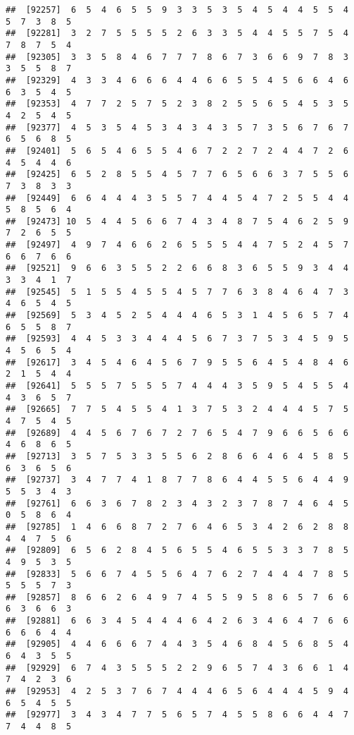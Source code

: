 \documentclass[
]{book}
\begin{document}
\begin{verbatim}
##  [92257]  6  5  4  6  5  5  9  3  3  5  3  5  4  5  4  4  5  5  4  5  7  3  8  5
##  [92281]  3  2  7  5  5  5  5  2  6  3  3  5  4  4  5  5  7  5  4  7  8  7  5  4
##  [92305]  3  3  5  8  4  6  7  7  7  8  6  7  3  6  6  9  7  8  3  3  5  5  8  7
##  [92329]  4  3  3  4  6  6  6  4  4  6  6  5  5  4  5  6  6  4  6  6  3  5  4  5
##  [92353]  4  7  7  2  5  7  5  2  3  8  2  5  5  6  5  4  5  3  5  4  2  5  4  5
##  [92377]  4  5  3  5  4  5  3  4  3  4  3  5  7  3  5  6  7  6  7  6  5  6  8  5
##  [92401]  5  6  5  4  6  5  5  4  6  7  2  2  7  2  4  4  7  2  6  4  5  4  4  6
##  [92425]  6  5  2  8  5  5  4  5  7  7  6  5  6  6  3  7  5  5  6  7  3  8  3  3
##  [92449]  6  6  4  4  4  3  5  5  7  4  4  5  4  7  2  5  5  4  4  5  8  5  6  4
##  [92473] 10  5  4  4  5  6  6  7  4  3  4  8  7  5  4  6  2  5  9  7  2  6  5  5
##  [92497]  4  9  7  4  6  6  2  6  5  5  5  4  4  7  5  2  4  5  7  6  6  7  6  6
##  [92521]  9  6  6  3  5  5  2  2  6  6  8  3  6  5  5  9  3  4  4  3  3  4  1  7
##  [92545]  5  1  5  5  4  5  5  4  5  7  7  6  3  8  4  6  4  7  3  4  6  5  4  5
##  [92569]  5  3  4  5  2  5  4  4  4  6  5  3  1  4  5  6  5  7  4  6  5  5  8  7
##  [92593]  4  4  5  3  3  4  4  4  5  6  7  3  7  5  3  4  5  9  5  4  5  6  5  4
##  [92617]  3  4  5  4  6  4  5  6  7  9  5  5  6  4  5  4  8  4  6  2  1  5  4  4
##  [92641]  5  5  5  7  5  5  5  7  4  4  4  3  5  9  5  4  5  5  4  4  3  6  5  7
##  [92665]  7  7  5  4  5  5  4  1  3  7  5  3  2  4  4  4  5  7  5  4  7  5  4  5
##  [92689]  4  4  5  6  7  6  7  2  7  6  5  4  7  9  6  6  5  6  6  4  6  8  6  5
##  [92713]  3  5  7  5  3  3  5  5  6  2  8  6  6  4  6  4  5  8  5  6  3  6  5  6
##  [92737]  3  4  7  7  4  1  8  7  7  8  6  4  4  5  5  6  4  4  9  5  5  3  4  3
##  [92761]  6  6  3  6  7  8  2  3  4  3  2  3  7  8  7  4  6  4  5  0  5  8  6  4
##  [92785]  1  4  6  6  8  7  2  7  6  4  6  5  3  4  2  6  2  8  8  4  4  7  5  6
##  [92809]  6  5  6  2  8  4  5  6  5  5  4  6  5  5  3  3  7  8  5  4  9  5  3  5
##  [92833]  5  6  6  7  4  5  5  6  4  7  6  2  7  4  4  4  7  8  5  5  5  5  7  3
##  [92857]  8  6  6  2  6  4  9  7  4  5  5  9  5  8  6  5  7  6  6  6  3  6  6  3
##  [92881]  6  6  3  4  5  4  4  4  6  4  2  6  3  4  6  4  7  6  6  6  6  6  4  4
##  [92905]  4  4  6  6  6  7  4  4  3  5  4  6  8  4  5  6  8  5  4  6  4  3  5  5
##  [92929]  6  7  4  3  5  5  5  2  2  9  6  5  7  4  3  6  6  1  4  7  4  2  3  6
##  [92953]  4  2  5  3  7  6  7  4  4  4  6  5  6  4  4  4  5  9  4  6  5  4  5  5
##  [92977]  3  4  3  4  7  7  5  6  5  7  4  5  5  8  6  6  4  4  7  7  4  4  8  5

\end{verbatim}
\end{document}
